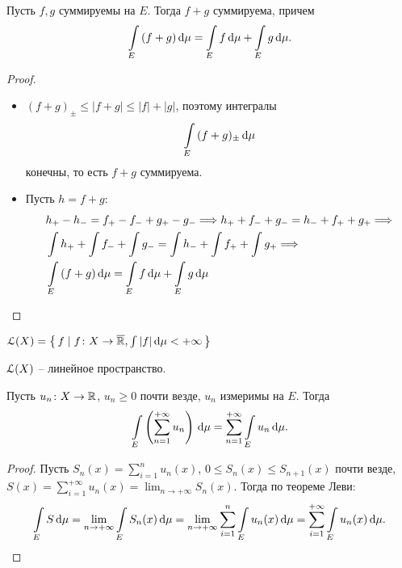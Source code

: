 \begin{corollary}
    
    Пусть $f, g$ суммируемы на $E$. Тогда $f + g$ суммируема, причем
\[
    \int\limits_E{(f + g) \,\mathrm{d}\mu} = \int\limits_E{f \,\mathrm{d}\mu} + \int\limits_E{g \,\mathrm{d}\mu}
.\]
\end{corollary}
\begin{proof}
    \enewline
    \begin{itemize}
        \item $(f+g)_{\pm} \leqslant |f + g| \leqslant |f| + |g|$, поэтому интегралы
\[
    \int\limits_{E}{(f + g)_{\pm} \,\mathrm{d}\mu}
\] 
        конечны, то есть $f + g$ суммируема.
        \item Пусть $h = f + g$:
        \begin{align*}
            &h_+ - h_- = f_+ - f_- + g_+ - g_- \Longrightarrow h_+ + f_- + g_- = h_- + f_+ + g_+ \Longrightarrow \\
            &\int{h_+} + \int{f_-} + \int{g_-} = \int{h_-} + \int{f_+} + \int{g_+} \Longrightarrow \\
            &\int\limits_{E}{(f + g) \,\mathrm{d}\mu} = \int\limits_{E}{f \,\mathrm{d}\mu} + \int\limits_{E}{g \,\mathrm{d}\mu}
        \end{align*}
    \end{itemize}
\end{proof}

\begin{definition}
    $\mathcal{L}(X) = \left\{\, f \mid f \colon X \to \overline{\mathbb{R}}, \int{|f| \,\mathrm{d}\mu} < +\infty \,\right\}$
\end{definition}

\begin{lemma}
    $\mathcal{L}(X)$ -- линейное пространство. 
\end{lemma}

\begin{theorem}
    Пусть $u_n \colon X \to \mathbb{R}$, $u_n \geqslant 0$ почти везде, $u_n$ измеримы на $E$.
    Тогда
\[
    \int\limits_E{\left(\sum_{n = 1}^{+\infty}{u_n}\right) \,\mathrm{d}\mu} = \sum_{n = 1}^{+\infty}{\int\limits_E{u_n \,\mathrm{d}\mu}}
.\]
\end{theorem}
\begin{proof}
    Пусть $\displaystyle S_n(x) = \sum_{i = 1}^n{u_n(x)}$, $0 \leqslant S_n(x) \leqslant S_{n + 1}(x)$ почти везде,
    $\displaystyle S(x) = \sum_{i = 1}^{+\infty}{u_n(x)} = \lim_{n \to +\infty}{S_n(x)}$.
    Тогда по теореме Леви:
\[
    \int\limits_{E}{S \,\mathrm{d}\mu} = \lim_{n \to +\infty}{\int\limits_{E}{S_n(x) \,\mathrm{d}\mu}} =
    \lim_{n \to +\infty}{\sum_{i = 1}^n{\int\limits_{E}{u_n(x) \,\mathrm{d}\mu}}} =
    \sum_{i = 1}^{+\infty}{\int\limits_{E}{u_n(x) \,\mathrm{d}\mu}}
.\]
\end{proof}

